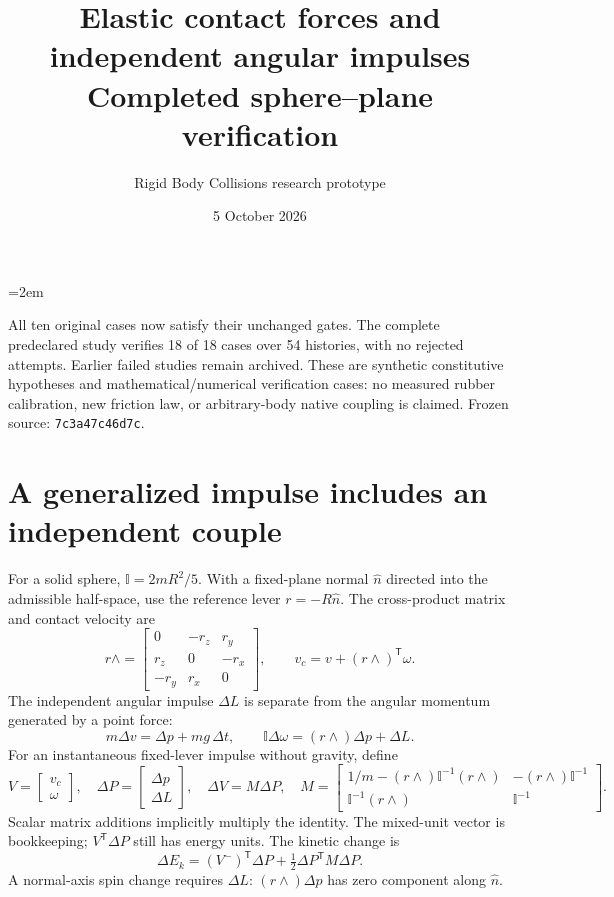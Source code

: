 \documentclass[10pt]{article}
\title{Elastic contact forces and independent angular impulses\\Completed sphere--plane verification}
\author{Rigid Body Collisions research prototype}\date{5 October 2026}
\begin{document}
\emergencystretch=2em\maketitle
All ten original cases now satisfy their unchanged gates. The complete predeclared study verifies 18 of 18 cases over 54 histories, with no rejected attempts. Earlier failed studies remain archived. These are synthetic constitutive hypotheses and mathematical/numerical verification cases: no measured rubber calibration, new friction law, or arbitrary-body native coupling is claimed. Frozen source: \texttt{7c3a47c46d7c}.
\section*{A generalized impulse includes an independent couple}
For a solid sphere, $\mathbb I=2mR^2/5$. With a fixed-plane normal $\hat n$ directed into the admissible half-space, use the reference lever $r=-R\hat n$. The cross-product matrix and contact velocity are
\[
r\wedge=\begin{bmatrix}0&-r_z&r_y\\r_z&0&-r_x\\-r_y&r_x&0\end{bmatrix},\qquad
v_c=v+(r\wedge)^\mathsf T\omega.
\]
The independent angular impulse $\Delta L$ is separate from the angular momentum generated by a point force:
\[
m\Delta v=\Delta p+mg\,\Delta t,\qquad
\mathbb I\Delta\omega=(r\wedge)\Delta p+\Delta L.
\]
For an instantaneous fixed-lever impulse without gravity, define
\[
V=\begin{bmatrix}v_c\\\omega\end{bmatrix},\quad
\Delta P=\begin{bmatrix}\Delta p\\\Delta L\end{bmatrix},\quad
\Delta V=M\Delta P,\quad
M=\begin{bmatrix}1/m-(r\wedge)\mathbb I^{-1}(r\wedge)&-(r\wedge)\mathbb I^{-1}\\
\mathbb I^{-1}(r\wedge)&\mathbb I^{-1}\end{bmatrix}.
\]
Scalar matrix additions implicitly multiply the identity. The mixed-unit vector is bookkeeping; $V^\mathsf T\Delta P$ still has energy units. The kinetic change is
\[
\Delta E_k=(V^-)^\mathsf T\Delta P+\tfrac12\Delta P^\mathsf T M\Delta P.
\]
A normal-axis spin change requires $\Delta L$: $(r\wedge)\Delta p$ has zero component along $\hat n$.
\end{document}
